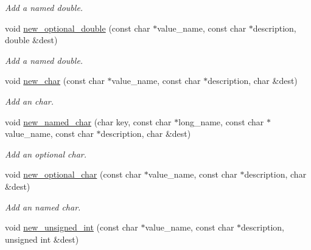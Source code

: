 \begin{DoxyCompactItemize}
\begin{DoxyCompactList}\small\item\em Add a named double. \end{DoxyCompactList}\item 
\hypertarget{classdsr_1_1_argument__helper_aa38e2e79f6d944acccd1449cf1744d9f}{
void \hyperlink{classdsr_1_1_argument__helper_aa38e2e79f6d944acccd1449cf1744d9f}{new\_\-optional\_\-double} (const char $\ast$value\_\-name, const char $\ast$description, double \&dest)}
\label{classdsr_1_1_argument__helper_aa38e2e79f6d944acccd1449cf1744d9f}

\begin{DoxyCompactList}\small\item\em Add a named double. \end{DoxyCompactList}\item 
\hypertarget{classdsr_1_1_argument__helper_a859fd00ec381bb5b04639e671c33f026}{
void \hyperlink{classdsr_1_1_argument__helper_a859fd00ec381bb5b04639e671c33f026}{new\_\-char} (const char $\ast$value\_\-name, const char $\ast$description, char \&dest)}
\label{classdsr_1_1_argument__helper_a859fd00ec381bb5b04639e671c33f026}

\begin{DoxyCompactList}\small\item\em Add an char. \end{DoxyCompactList}\item 
\hypertarget{classdsr_1_1_argument__helper_ab601443c3be10b2de0ccdac7d717ef1c}{
void \hyperlink{classdsr_1_1_argument__helper_ab601443c3be10b2de0ccdac7d717ef1c}{new\_\-named\_\-char} (char key, const char $\ast$long\_\-name, const char $\ast$value\_\-name, const char $\ast$description, char \&dest)}
\label{classdsr_1_1_argument__helper_ab601443c3be10b2de0ccdac7d717ef1c}

\begin{DoxyCompactList}\small\item\em Add an optional char. \end{DoxyCompactList}\item 
\hypertarget{classdsr_1_1_argument__helper_a6ff1ae0626aad57fd07b7118b32fb6bf}{
void \hyperlink{classdsr_1_1_argument__helper_a6ff1ae0626aad57fd07b7118b32fb6bf}{new\_\-optional\_\-char} (const char $\ast$value\_\-name, const char $\ast$description, char \&dest)}
\label{classdsr_1_1_argument__helper_a6ff1ae0626aad57fd07b7118b32fb6bf}

\begin{DoxyCompactList}\small\item\em Add an named char. \end{DoxyCompactList}\item 
\hypertarget{classdsr_1_1_argument__helper_add46df19a0a68a20c4bdab4a9948bd24}{
void \hyperlink{classdsr_1_1_argument__helper_add46df19a0a68a20c4bdab4a9948bd24}{new\_\-unsigned\_\-int} (const char $\ast$value\_\-name, const char $\ast$description, unsigned int \&dest)}
\label{classdsr_1_1_argument__helper_add46df19a0a68a20c4bdab4a9948bd24}


\end{DoxyCompactItemize}
